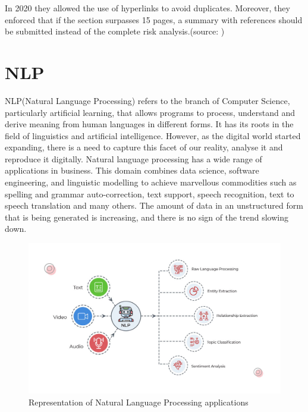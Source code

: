 \documentclass[12pt,MSc,a4paper,oneside]{muthesis}
\begin{document}
In 2020 they allowed the use of hyperlinks to avoid duplicates. Moreover, they enforced that if the section surpasses 15 pages, a summary with references should be submitted instead of the complete risk analysis.(source: \cite{modernisation-ruling})

\section{NLP}
NLP(Natural Language Processing) refers to the branch of Computer Science, particularly artificial learning, that allows programs to process, understand and derive meaning from human languages in different forms. It has its roots in the field of linguistics and artificial intelligence. However, as the digital world started expanding, there is a need to capture this facet of our reality, analyse it and reproduce it digitally. Natural language processing has a wide range of applications in business. This domain combines data science, software engineering, and linguistic modelling to achieve marvellous commodities such as spelling and grammar auto-correction, text support, speech recognition, text to speech translation and many others. The amount of data in an unstructured form that is being generated is increasing, and there is no sign of the trend slowing down.

\begin{figure}[h]
  \centering
  \includegraphics[scale=0.5]{images/abstract/NLP_Processing.jpg}
  \caption{Representation of Natural Language Processing applications}
\end{figure}
\end{document}
